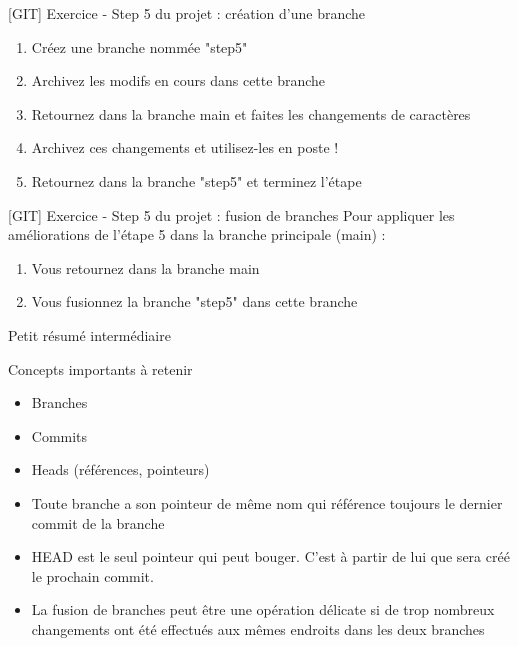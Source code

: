 \documentclass[a4paper,11pt]{beamer}
\newcounter{exampleBlockCounter}
\begin{document}
\begin{frame}

\begin{exampleblock}{[GIT] Exercice  - Step 5 du projet : création d'une branche}
\begin{enumerate}
    \item Créez une branche nommée "step5"
    \item Archivez les modifs en cours dans cette branche
    \item Retournez dans la branche main et faites les changements de caractères
    \item Archivez ces changements et utilisez-les en poste !
    \item Retournez dans la branche "step5" et terminez l'étape
\end{enumerate}
\end{exampleblock}

\begin{exampleblock}{[GIT] Exercice  -  Step 5 du projet : fusion de branches}
Pour appliquer les améliorations de l'étape 5 dans la branche principale (main) :
\begin{enumerate}
    \item Vous retournez dans la branche main
    \item Vous fusionnez la branche "step5" dans cette branche
\end{enumerate}
\end{exampleblock}

\end{frame}

\begin{frame}{Petit résumé intermédiaire}

\begin{alertblock}{Concepts importants à retenir}
\begin{itemize}
\item Branches
\item Commits
\item Heads (références, pointeurs)
\item Toute branche a son pointeur de même nom qui référence toujours le dernier commit de la branche
\item HEAD est le seul pointeur qui peut bouger. C'est à partir de lui que sera créé le prochain commit.
\item La fusion de branches peut être une opération délicate si de trop nombreux changements ont été effectués aux mêmes endroits dans les deux branches
\end{itemize}
\end{alertblock}

\end{frame}
\end{document}
